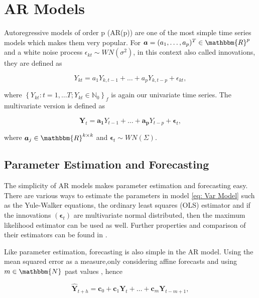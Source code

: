 \section{AR Models}
\label{sec: Ar Models}

Autoregressive models of order p (AR(p))  are one of the most simple time series models which makes them very popular. For $\bm{a}=(a_1,\ldots,a_p)^T \in \mathbbm{R}^p$ and a white noise process $\epsilon_{kt} \sim WN(\sigma^2)$, in this context also called innovations, they are defined as 

\begin{equation}
Y_{kt} = a_1Y_{k,t-1} + \ldots + a_pY_{k,t-p} + \epsilon_{kt},
\label{eq: Ar model}
\end{equation}

where $\left\{Y_{kt}:t=1,\ldots T; Y_{kt} \in \mathbb{N}_0\right\}_f$ is again our univariate time series. The multivariate version is defined as 

\begin{equation}
\bm{Y}_{t} = \bm{a_1}Y_{t-1} + \ldots + \bm{a_p}Y_{t-p} + \bm{\epsilon}_{t},
\label{eq: Var Model}
\end{equation}

where $\bm{a}_j \in \mathbbm{R}^{k \times k}$ and $\bm{\epsilon}_t \sim WN(\Sigma)$.%

\subsection{Parameter Estimation and Forecasting}
\label{sec: AR Estimation and Forecasting}

The simplicity of AR models makes parameter estimation and forecasting easy. There are various ways to estimate the parameters in model \ref{eq: Var Model} such as the Yule-Walker equations, the ordinary least squares (OLS) estimator and if the innovations $(\bm{\epsilon}_t)$ are multivariate normal distributed, then the maximum likelihood estimator can be used as well. Further properties and comparison of their estimators can be found in \cite{Scherrer:2021}. 

Like parameter estimation, forecasting is also simple in the AR model. Using the mean squared error as a measure,only considering affine forecasts and using $m \in \mathbbm{N}$ past values , hence 

\begin{equation}
\hat{\bm{Y}}_{t+h} = \bm{c}_0 + \bm{c}_1\bm{Y}_{t} + \ldots + \bm{c}_m\bm{Y}_{t-m+1},
\label{eq:Forecasting general}
\end{equation}

